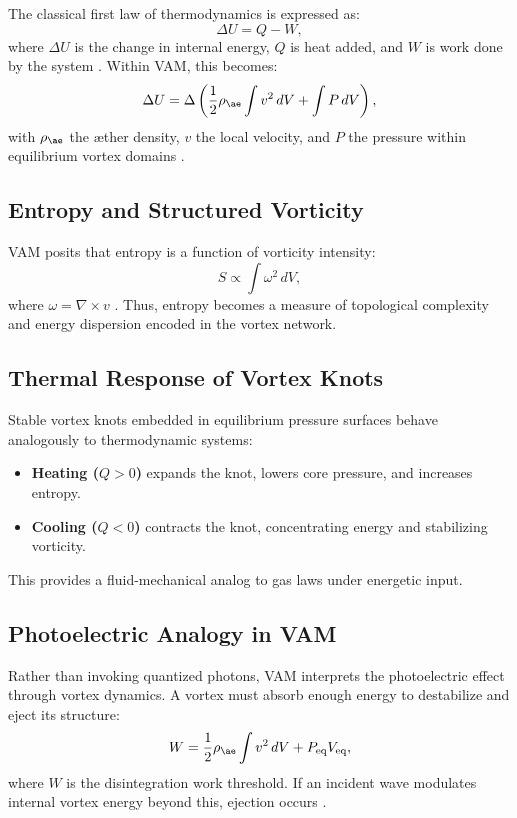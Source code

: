 The classical first law of thermodynamics is expressed as:
\begin{equation}
\Delta U = Q - W,
\end{equation}
where $\Delta U$ is the change in internal energy, $Q$ is heat added, and $W$ is work done by the system \cite{clausius1865mechanical}. Within VAM, this becomes:
\begin{equation}
\Delta U = \Delta \left( \frac{1}{2} \rho_{\ae} \int v^2 \, dV + \int P \, dV \right),
\end{equation}
with $\rho_{\ae}$ the æther density, $v$ the local velocity, and $P$ the pressure within equilibrium vortex domains \cite{vam2025unified}.

\subsection{Entropy and Structured Vorticity}

VAM posits that entropy is a function of vorticity intensity:
\begin{equation}
S \propto \int \omega^2 \, dV,
\end{equation}
where $\omega = \nabla \times v$ \cite{kelvin1867vortex}. Thus, entropy becomes a measure of topological complexity and energy dispersion encoded in the vortex network.

\subsection{Thermal Response of Vortex Knots}

Stable vortex knots embedded in equilibrium pressure surfaces behave analogously to thermodynamic systems:
\begin{itemize}
\item \textbf{Heating ($Q > 0$)} expands the knot, lowers core pressure, and increases entropy.
\item \textbf{Cooling ($Q < 0$)} contracts the knot, concentrating energy and stabilizing vorticity.
\end{itemize}
This provides a fluid-mechanical analog to gas laws under energetic input.

\subsection{Photoelectric Analogy in VAM}

Rather than invoking quantized photons, VAM interprets the photoelectric effect through vortex dynamics. A vortex must absorb enough energy to destabilize and eject its structure:
\begin{equation}
W = \frac{1}{2} \rho_{\ae} \int v^2 \, dV + P_{\text{eq}} V_{\text{eq}},
\end{equation}
where $W$ is the disintegration work threshold. If an incident wave modulates internal vortex energy beyond this, ejection occurs \cite{vam2025unified}.

